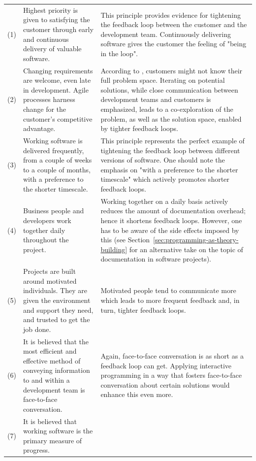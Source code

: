 \begin{block}
\begin{longtable}{@{}cp{}p{}@{}}
    (1) &
    Highest priority is given to satisfying the customer through early and continuous delivery of valuable software. &
    This principle provides evidence for tightening the feedback loop between the customer and the development team.
    Continuously delivering software gives the customer the feeling of "being in the loop".
    \\
    (2) &
    Changing requirements are welcome, even late in development. Agile processes harness change for the customer’s competitive advantage. &
    According to \cite{van_der_aalst_historical_2008}, customers might not know their full problem space.
    Iterating on potential solutions, while close communication between development teams and customers is emphasized, leads to a co-exploration of the problem, as well as the solution space, enabled by tighter feedback loops.
    \\
    (3) &
    Working software is delivered frequently, from a couple of weeks to a couple of months, with a preference to the shorter timescale. &
    This principle represents the perfect example of tightening the feedback loop between different versions of software.
    One should note the emphasis on "with a preference to the shorter timescale" which actively promotes shorter feedback loops.
    \\
    (4) &
    Business people and developers work together daily throughout the project. &
    Working together on a daily basis actively reduces the amount of documentation overhead; hence it shortens feedback loops.
    However, one has to be aware of the side effects imposed by this (see Section~\ref{sec:programming-as-theory-building} for an alternative take on the topic of documentation in software projects).
    \\
    (5) &
    Projects are built around motivated individuals.
    They are given the environment and support they need, and trusted to get the job done. &
    Motivated people tend to communicate more which leads to more frequent feedback and, in turn, tighter feedback loops.
    \\
    (6) &
    It is believed that the most efficient and effective method of conveying information to and within a development team is face-to-face conversation. &
    Again, face-to-face conversation is as short as a feedback loop can get.
    Applying interactive programming in a way that fosters face-to-face conversation about certain solutions would enhance this even more.
    \\
    (7) &
    It is believed that working software is the primary measure of progress.&

\end{longtable}
\end{block}
